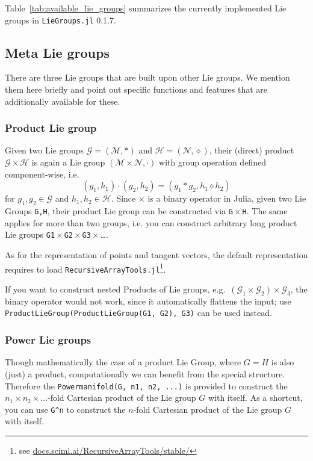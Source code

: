 \documentclass{juliacon}
\newcommand{\LieGroupsVersion}{0.1.7}
\begin{document}
Table~\ref{tab:available_lie_groups} summarizes the currently implemented Lie groups in \verb|LieGroups.jl| \LieGroupsVersion.

\subsection{Meta Lie groups}\label{subsec:MetaLieGroups}

There are three Lie groups that are built upon other Lie groups. We mention them here briefly and point out specific functions and features that are additionally available for these.

\subsubsection*{Product Lie group}

Given two Lie groups \(\mathcal{G} = (\mathcal M, \ast) \) and \(\mathcal{H} = (\mathcal N, \diamond)\), their (direct) product \(\mathcal{G} \times \mathcal{H}\) is again a Lie group \((\mathcal{M} \times \mathcal{N}, \cdot)\) with group operation defined component-wise, i.e.
\begin{equation*}
    (g_1, h_1) \cdot (g_2, h_2) = (g_1 \ast g_2, h_1 \diamond h_2)
\end{equation*}
for \(g_1, g_2 \in \mathcal{G}\) and \(h_1, h_2 \in \mathcal{H}\).
Since $\times$ is a binary operator in Julia, given two Lie Groups \verb|G,H|, their product Lie group can be constructed via \verb|G|\,$\times$\,\verb|H|.
The same applies for more than two groups, i.e. you can construct arbitrary long product Lie groups \verb|G1|\,$\times$\,\verb|G2|\,$\times$\,\verb|G3|\,$\times$\,\ldots.

As for the representation of points and tangent vectors, the default representation requires to load \verb|RecursiveArrayTools.jl|\footnote{see \href{https://docs.sciml.ai/RecursiveArrayTools/stable/}{docs.sciml.ai/RecursiveArrayTools/stable/}}.

If you want to construct nested Products of Lie groups, e.g.\ \((\mathcal G_1 \times \mathcal G_2) \times \mathcal G_3\), the binary operator would not work, since it automatically flattens the input; use \verb|ProductLieGroup(ProductLieGroup(G1, G2), G3)| can be used instead.

\subsubsection*{Power Lie groups}
Though mathematically the case of a product Lie Group, where $G=H$ is also (just) a product, computationally we can benefit from the special structure. Therefore the \verb|Powermanifold(G, n1, n2, ...)| is provided to construct the \(n_1 \times n_2 \times \ldots\)-fold Cartesian product of the Lie group \(G\) with itself.
As a shortcut, you can use \verb|G^n| to construct the \(n\)-fold Cartesian product of the Lie group \(G\) with itself.
\end{document}
